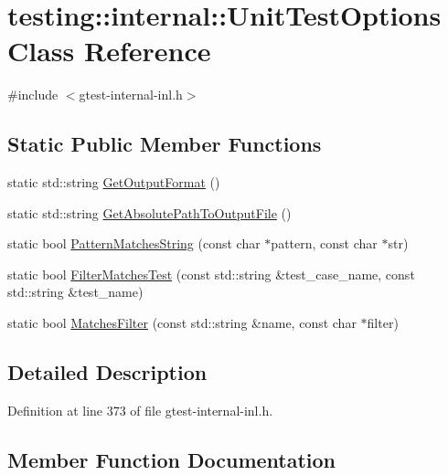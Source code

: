 \hypertarget{classtesting_1_1internal_1_1_unit_test_options}{}\section{testing\+:\+:internal\+:\+:Unit\+Test\+Options Class Reference}
\label{classtesting_1_1internal_1_1_unit_test_options}


{\ttfamily \#include $<$gtest-\/internal-\/inl.\+h$>$}

\subsection*{Static Public Member Functions}
\begin{DoxyCompactItemize}
\item 
static std\+::string \hyperlink{classtesting_1_1internal_1_1_unit_test_options_ae7413a21296d885c6924650b51ac4f6d}{Get\+Output\+Format} ()
\item 
static std\+::string \hyperlink{classtesting_1_1internal_1_1_unit_test_options_a993fb30ad66104158c8c0ac508daca3f}{Get\+Absolute\+Path\+To\+Output\+File} ()
\item 
static bool \hyperlink{classtesting_1_1internal_1_1_unit_test_options_af0235a2ee26dd6db21305e11d2358e4f}{Pattern\+Matches\+String} (const char $\ast$pattern, const char $\ast$str)
\item 
static bool \hyperlink{classtesting_1_1internal_1_1_unit_test_options_a9975b59cece94874b303421697e3bca6}{Filter\+Matches\+Test} (const std\+::string \&test\+\_\+case\+\_\+name, const std\+::string \&test\+\_\+name)
\item 
static bool \hyperlink{classtesting_1_1internal_1_1_unit_test_options_a67fc0adaffbb8d320b92e42e05017e4e}{Matches\+Filter} (const std\+::string \&name, const char $\ast$filter)
\end{DoxyCompactItemize}


\subsection{Detailed Description}


Definition at line 373 of file gtest-\/internal-\/inl.\+h.



\subsection{Member Function Documentation}
